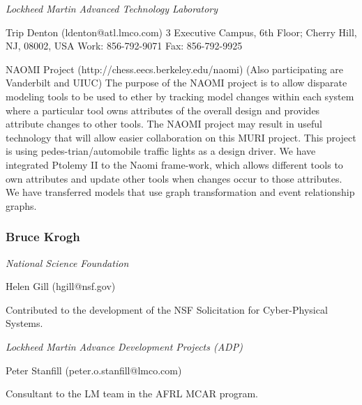                 \emph{Lockheed Martin Advanced Technology Laboratory}

                Trip Denton (ldenton@atl.lmco.com) 
                3 Executive Campus, 6th Floor; Cherry Hill, NJ, 08002, USA
                Work: 856-792-9071 Fax: 856-792-9925

                NAOMI Project (http://chess.eecs.berkeley.edu/naomi) (Also participating are Vanderbilt and UIUC) The purpose of the NAOMI project is to allow disparate modeling tools to be used to ether by tracking model changes within each system where a particular tool owns attributes of the overall design and provides attribute changes to other tools. The NAOMI project may result in useful technology that will allow easier collaboration on this MURI project. This project is using pedes-trian/automobile traffic lights as a design driver. We have integrated Ptolemy II to the Naomi frame-work, which allows different tools to own attributes and update other tools when changes occur to those attributes. We have transferred models that use graph transformation and event relationship graphs.

                


\subsubsection{Bruce Krogh}

\emph{National Science Foundation}

Helen Gill (hgill@nsf.gov)

Contributed to the development of the NSF Solicitation for Cyber-Physical Systems.

\emph{Lockheed Martin Advance Development Projects (ADP)}

Peter Stanfill (peter.o.stanfill@lmco.com)

Consultant to the LM team in the AFRL MCAR program.

